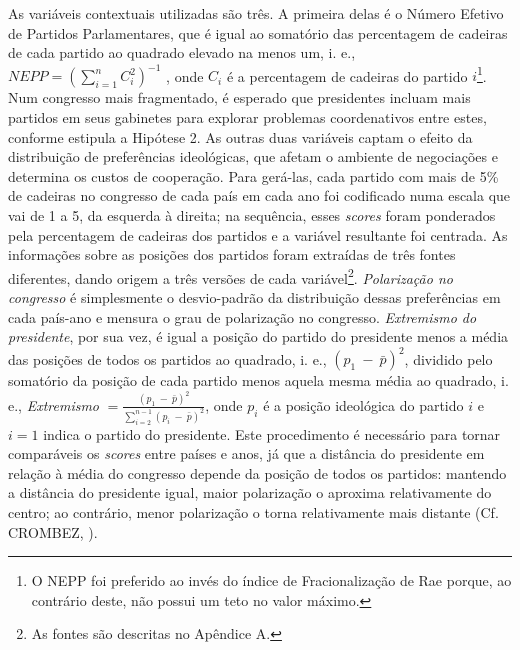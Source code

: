 As variáveis contextuais utilizadas são três. A primeira delas é o Número Efetivo de Partidos Parlamentares, que é igual ao somatório das percentagem de cadeiras de cada partido ao quadrado elevado na menos um, i. e., $NEPP = (\sum_{i=1}^{n} C_{i}^2)^{-1}$ , onde $C_{i}$ é a percentagem de cadeiras do partido $i$\footnote{O NEPP foi preferido ao invés do índice de Fracionalização de Rae porque, ao contrário deste, não possui um teto no valor máximo.}. Num congresso mais fragmentado, é esperado que presidentes incluam mais partidos em seus gabinetes para explorar problemas coordenativos entre estes, conforme estipula a Hipótese 2. As outras duas variáveis captam o efeito da distribuição de preferências ideológicas, que afetam o ambiente de negociações e determina os custos de cooperação. Para gerá-las, cada partido com mais de 5\% de cadeiras no congresso de cada país em cada ano foi codificado numa escala que vai de 1 a 5, da esquerda à direita; na sequência, esses \textit{scores} foram ponderados pela percentagem de cadeiras dos partidos e a variável resultante foi centrada. As informações sobre as posições dos partidos foram extraídas de três fontes diferentes, dando origem a três versões de cada variável\footnote{As fontes são descritas no Apêndice A.}. \textit{Polarização no congresso} é simplesmente o desvio-padrão da distribuição dessas preferências em cada país-ano e mensura o grau de polarização no congresso. \textit{Extremismo do presidente}, por sua vez, é igual a posição do partido do presidente menos a média das posições de todos os partidos ao quadrado, i. e., $(p_{1}~ -~\bar{p})^2$, dividido pelo somatório da posição de cada partido menos aquela mesma média ao quadrado, i. e., \textit{Extremismo} $= \frac{(p_{1}~ -~\bar{p})^2}{\sum_{i=2}^{n-1} (p_{i} ~ - ~ \bar{p})^2}$, onde $p_{i}$ é a posição ideológica do partido $i$ e $i = 1$ indica o partido do presidente. Este procedimento é necessário para tornar comparáveis os \textit{scores} entre países e anos, já que a distância do presidente em relação à média do congresso depende da posição de todos os partidos: mantendo a distância do presidente igual, maior polarização o aproxima relativamente do centro; ao contrário, menor polarização o torna relativamente mais distante (Cf. CROMBEZ, \citeyear{crombez1996}).
 
